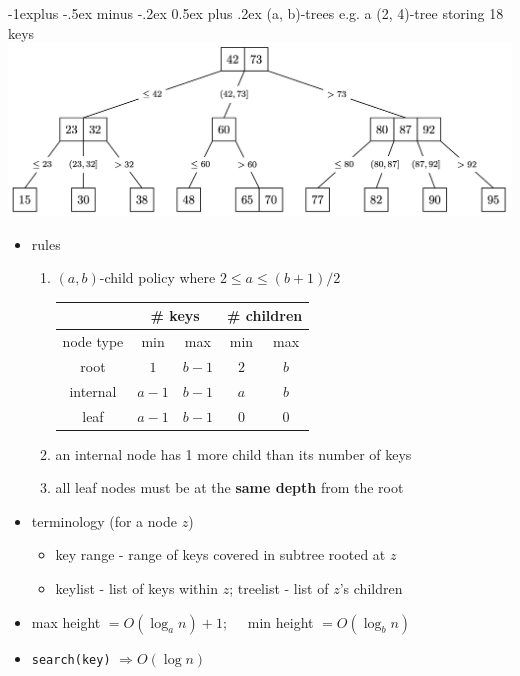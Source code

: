 \documentclass[10pt, landscape]{article}
\makeatletter
\renewcommand{\subsection}{\@startsection{subsection}{2}{0mm}%
                                {-1explus -.5ex minus -.2ex}%
                                {0.5ex plus .2ex}%
                                {\normalfont\normalsize\bfseries}}
\let\Then\Rightarrow
\newcommand{\code}[1]{\textcolor{mygreen}{\texttt{#1}}}
\makeatother
\begin{document}
\begin{multicols}{4}
\subsection{(a, b)-trees}
{\scriptsize{e.g. a (2, 4)-tree storing 18 keys}}
\includegraphics[width=0.8\linewidth]{cs2040s-ab-tree.png}
\begin{itemize}
    \item rules
    \begin{enumerate}
        \item $(a, b)$-child policy where $2 \leq a \leq (b+1)/2$
        \begin{tabular}{|c|c|c|c|c|}
            \hline 
             & \multicolumn{2}{c|}{\# keys} & \multicolumn{2}{c|}{\# children}
            \\\hline
            node type & min & max & min & max
            \\\hline
            root & $1$ & $b-1$ & $2$ & $b$
            \\\hline
            internal & $a-1$ & $b-1$ & $a$ & $b$
            \\\hline
            leaf & $a-1$ & $b-1$ & $0$ & $0$
            \\\hline
        \end{tabular}
        \item an internal node has 1 more child than its number of keys
        \item all leaf nodes must be at the \textbf{same depth} from the root
    \end{enumerate}
    \item terminology (for a node $z$)
    \begin{itemize}
        \item key range - range of keys covered in subtree rooted at $z$
        \item keylist - list of keys within $z$; treelist - list of $z$'s children
    \end{itemize}
    \item max height $= O(\log_an) + 1;\quad$ min height $= O(\log_bn)$
    \item \code{search(key)} $\Then O(\log n)$

\end{itemize}
\end{multicols}
\end{document}
